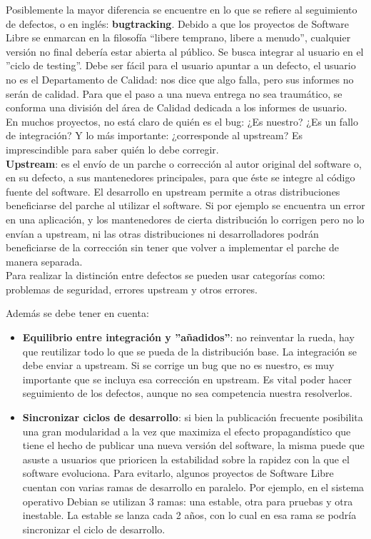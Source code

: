 Posiblemente la mayor diferencia se encuentre en lo que se refiere al seguimiento de defectos, o en inglés: \textbf{bugtracking}. Debido a que los proyectos de Software Libre se enmarcan en la filosofía  “libere temprano, libere a menudo”, cualquier versión no ­final debería estar abierta al público. Se busca integrar al usuario en el ''ciclo de testing''. Debe ser fácil para el usuario apuntar a un defecto, el usuario no es el Departamento de Calidad: nos dice que algo falla, pero sus informes no serán de calidad. Para que el paso a una nueva entrega no sea traumático, se conforma una división del área de Calidad dedicada a los informes de usuario.
\\

En muchos proyectos, no está claro de quién es el bug: ¿Es nuestro? ¿Es un fallo de integración? Y lo más importante: ¿corresponde al upstream? Es imprescindible para saber quién lo debe corregir.
\\

\textbf{Upstream}: es el envío de un parche o corrección al autor original del software o, en su defecto, a sus mantenedores principales, para que éste se integre al código fuente del software. El desarrollo en upstream permite a otras distribuciones beneficiarse del parche al utilizar el software. Si por ejemplo se encuentra un error en una aplicación, y los mantenedores de cierta distribución lo corrigen pero no lo envían a upstream, ni las otras distribuciones ni desarrolladores podrán beneficiarse de la corrección sin tener que volver a implementar el parche de manera separada.
\\

Para realizar la distinción entre defectos se pueden usar categorías como: problemas de seguridad, errores upstream y otros errores.

Además se debe tener en cuenta:
\begin{itemize}
     \item\textbf{Equilibrio entre integración y ''añadidos''}: no reinventar la rueda, hay que reutilizar todo lo que se pueda de la distribución base. La integración se debe enviar a upstream. Si se corrige un bug que no es nuestro, es muy importante que se incluya esa corrección en upstream. Es vital poder hacer seguimiento de los defectos, aunque no sea competencia nuestra resolverlos.
     \item\textbf{Sincronizar ciclos de desarrollo}: si bien la publicación frecuente posibilita una gran modularidad a la vez que maximiza el efecto propagandístico que tiene el hecho de publicar una nueva versión del software, la misma puede que asuste a usuarios que prioricen la estabilidad sobre la rapidez con la que el software evoluciona. Para evitarlo, algunos proyectos de Software Libre cuentan con varias ramas de desarrollo en paralelo. Por ejemplo, en el sistema operativo Debian se utilizan 3 ramas: una estable, otra para pruebas y otra inestable. La estable se lanza cada 2 años, con lo cual en esa rama se podría sincronizar el ciclo de desarrollo.
\end{itemize}